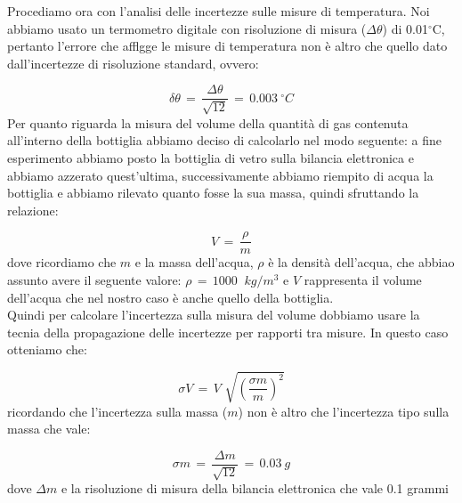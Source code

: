 Procediamo ora con l'analisi delle incertezze sulle misure di temperatura. Noi abbiamo usato un termometro digitale con risoluzione di misura ($\Delta \theta$) di 0.01$^\circ$C, pertanto l'errore che afflgge le misure di temperatura non è altro che quello dato dall'incertezze di risoluzione standard, ovvero:

\begin{equation*}
	\delta \theta \,=\, \frac{\Delta \theta}{\sqrt{12}} \,=\, \SI{0.003}{^\circ C}
\end{equation*}
%
Per quanto riguarda la misura del volume della quantità di gas contenuta all'interno della bottiglia abbiamo deciso di calcolarlo nel modo seguente: a fine esperimento abbiamo posto la bottiglia di vetro sulla bilancia elettronica e abbiamo azzerato quest'ultima, successivamente abbiamo riempito di acqua la bottiglia e abbiamo rilevato quanto fosse la sua massa, quindi sfruttando la relazione:

\begin{equation*}
	V \,=\, \frac{\rho}{m}  
\end{equation*}
%
dove ricordiamo che $m$ e la massa dell'acqua, $\rho$ è la densità dell'acqua, che abbiao assunto avere il seguente valore: $\rho \,=\, \SI{1000}{\,\,kg/m^3}$ e $V$ rappresenta il volume dell'acqua che nel nostro caso è anche quello della bottiglia.\\
Quindi per calcolare l'incertezza sulla misura del volume dobbiamo usare la tecnia della propagazione delle incertezze per rapporti tra misure. In questo caso otteniamo che:

\begin{equation*}
	\sigma V \,=\, V \,\, \sqrt{\left(\frac{\sigma m}{m}\right)^2}  
\end{equation*}
%
ricordando che l'incertezza sulla massa ($m$) non è altro che l'incertezza tipo sulla massa che vale:

\begin{equation*}
	\sigma m \,=\, \frac{\Delta m}{\sqrt{12}} \,=\, \SI{0.03}{g}
\end{equation*}
%
dove $\Delta m$ e la risoluzione di misura della bilancia elettronica che vale 0.1 grammi


















